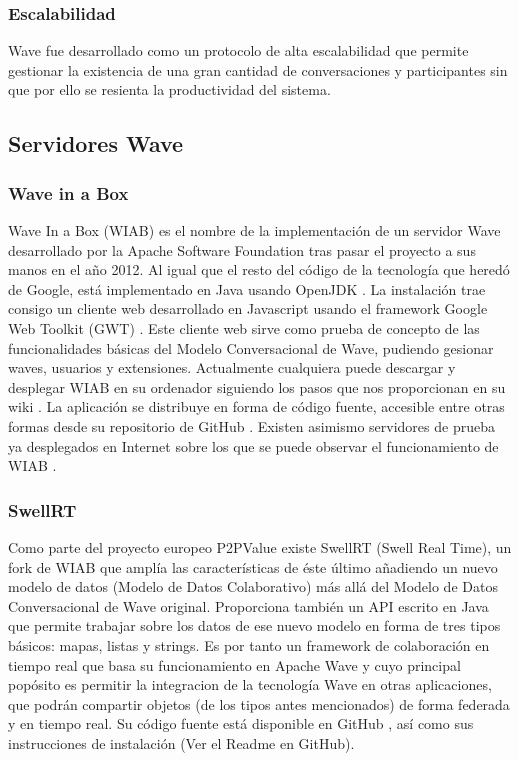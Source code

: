     \subsubsection{Escalabilidad}
    
    Wave fue desarrollado como un protocolo de alta escalabilidad que permite gestionar la existencia de una gran cantidad de conversaciones y participantes sin que por ello se resienta la productividad del sistema.
    
    \subsection{Servidores Wave}
  
    \subsubsection{Wave in a Box}\label{sssec:wiab}
    
    Wave In a Box (WIAB) \cite{ref:wave_in_a_box} es el nombre de la implementación de un servidor Wave desarrollado por la Apache Software Foundation tras pasar el proyecto a sus manos en el año 2012. Al igual que el resto del código de la tecnología que heredó de Google, está implementado en Java usando OpenJDK \cite{ref:openjdk}. La instalación trae consigo un cliente web desarrollado en Javascript usando el framework Google Web Toolkit (GWT) \cite{ref:gwt}. Este cliente web sirve como prueba de concepto de las funcionalidades básicas del Modelo Conversacional de Wave, pudiendo gesionar waves, usuarios y extensiones. Actualmente cualquiera puede descargar y desplegar WIAB en su ordenador siguiendo los pasos que nos proporcionan en su wiki \cite{ref:wave_in_a_box_wiki}. La aplicación se distribuye en forma de código fuente, accesible entre otras formas desde su repositorio de GitHub \cite{ref:wave_in_a_box_github}. Existen asimismo servidores de prueba ya desplegados en Internet sobre los que se puede observar el funcionamiento de WIAB \cite{ref:wave_in_a_box_server}.
   
   
    \subsubsection{SwellRT}\label{sssec:swellRT}
    
    Como parte del proyecto europeo P2PValue \cite{ref:p2pvalue} existe SwellRT (Swell Real Time), un fork de WIAB que amplía las características de éste último añadiendo un nuevo modelo de datos (Modelo de Datos Colaborativo) más allá del Modelo de Datos Conversacional de Wave original. Proporciona también un API escrito en Java que permite trabajar sobre los datos de ese nuevo modelo en forma de tres tipos básicos: mapas, listas y strings. Es por tanto un framework de colaboración en tiempo real que basa su funcionamiento en Apache Wave y cuyo principal popósito es permitir la integracion de la tecnología Wave en otras aplicaciones, que podrán compartir objetos (de los tipos antes mencionados) de forma federada y en tiempo real. Su código fuente está disponible en GitHub \cite{ref:swellRT_github}, así como sus instrucciones de instalación (Ver el Readme en GitHub).\\[.2cm]

